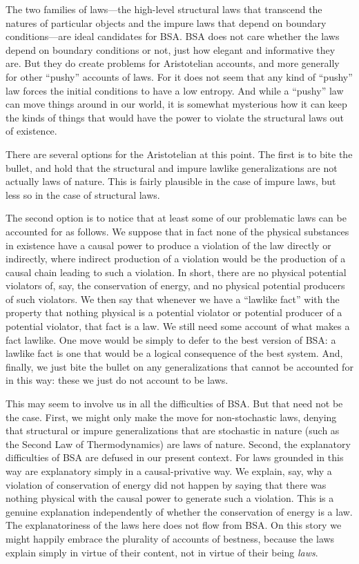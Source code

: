 The two families of laws---the high-level structural laws that transcend the natures of particular objects and the impure
laws that depend on boundary conditions---are ideal candidates for BSA. BSA does not care whether the laws depend on boundary
conditions or not, just how elegant and informative they are. But they do create problems for Aristotelian accounts, 
and more generally for other ``pushy'' accounts of laws. For it does not seem that any kind of ``pushy'' law 
forces the initial conditions to have a low entropy. And while a ``pushy'' law can move things around in our world, it is
somewhat mysterious how it can keep the kinds of things that would have the power to violate the structural laws out of 
existence.

There are several options for the Aristotelian at this point. The first is to bite the bullet, and hold that the structural
and impure lawlike generalizations are not actually laws of nature. This is fairly plausible in the case of impure laws, but
less so in the case of structural laws. 

The second option is to notice that at least some of our problematic laws can be accounted for as follows. We
suppose that in fact none of the physical substances in existence have a causal power to produce a violation of the law directly
or indirectly, where indirect production of a violation would be the production of a causal chain leading to such a violation.
In short, there are no physical potential violators of, say, the conservation of energy, and no physical potential producers of 
such violators. We then say that whenever we have a ``lawlike fact'' with the property that nothing physical is a potential violator
or potential producer of a potential violator, that fact is a law. We still need some account of what makes a fact lawlike. One move would be simply to defer to the best version of BSA: a lawlike
fact is one that would be a logical consequence of the best system. And, finally, we just bite the bullet on any generalizations that
cannot be accounted for in this way: these we just do not account to be laws.

This may seem to involve us in all the difficulties of BSA. But that need not be the case. First, we might only make the move for
non-stochastic laws, denying that structural or impure generalizations that are stochastic in nature (such as the Second Law of 
Thermodynamics) are laws of nature. Second, the explanatory difficulties of BSA are defused in our present context. For 
laws grounded in this way are explanatory simply in a causal-privative way. We explain, say, why a violation of 
conservation of energy did not happen by saying that there was nothing physical with the causal power to generate such a 
violation. This is a genuine explanation independently of whether the conservation of energy is a law. The
explanatoriness of the laws here does not flow from BSA. On this story we might happily embrace the plurality of accounts of
bestness, because the laws explain simply in virtue of their content, not in virtue of their being \textit{laws}.

